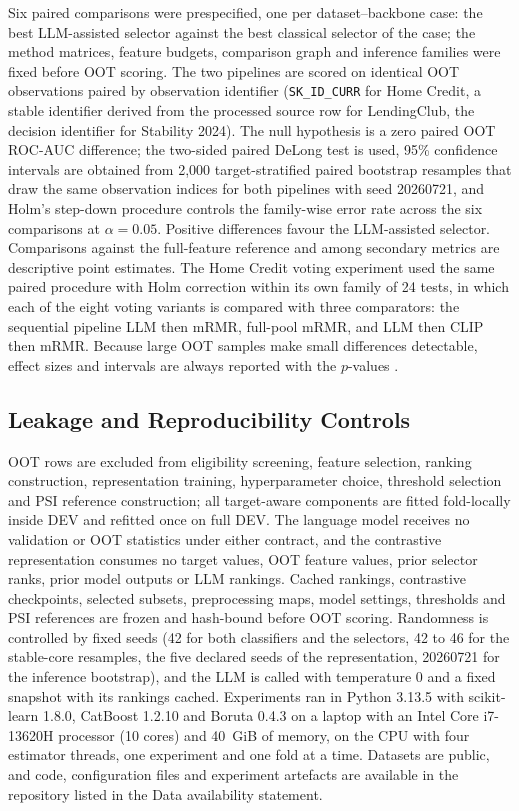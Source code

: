 \documentclass[final,5p,twocolumn]{elsarticle}
\begin{document}
Six paired comparisons were prespecified, one per dataset--backbone case: the best LLM-assisted selector against the best classical selector of the case; the method matrices, feature budgets, comparison graph and inference families were fixed before OOT scoring. The two pipelines are scored on identical OOT observations paired by observation identifier (\texttt{SK\_ID\_CURR} for Home Credit, a stable identifier derived from the processed source row for LendingClub, the decision identifier for Stability 2024). The null hypothesis is a zero paired OOT ROC-AUC difference; the two-sided paired DeLong test \cite{delong1988} is used, 95\% confidence intervals are obtained from 2,000 target-stratified paired bootstrap resamples that draw the same observation indices for both pipelines \cite{efron1993} with seed 20260721, and Holm's step-down procedure \cite{holm1979} controls the family-wise error rate across the six comparisons at $\alpha=0.05$. Positive differences favour the LLM-assisted selector. Comparisons against the full-feature reference and among secondary metrics are descriptive point estimates. The Home Credit voting experiment used the same paired procedure with Holm correction within its own family of 24 tests, in which each of the eight voting variants is compared with three comparators: the sequential pipeline LLM then mRMR, full-pool mRMR, and LLM then CLIP then mRMR. Because large OOT samples make small differences detectable, effect sizes and intervals are always reported with the $p$-values \cite{demsar2006}.

\subsection{Leakage and Reproducibility Controls}
\label{subsec:leakage_controls}

OOT rows are excluded from eligibility screening, feature selection, ranking construction, representation training, hyperparameter choice, threshold selection and PSI reference construction; all target-aware components are fitted fold-locally inside DEV and refitted once on full DEV. The language model receives no validation or OOT statistics under either contract, and the contrastive representation consumes no target values, OOT feature values, prior selector ranks, prior model outputs or LLM rankings. Cached rankings, contrastive checkpoints, selected subsets, preprocessing maps, model settings, thresholds and PSI references are frozen and hash-bound before OOT scoring. Randomness is controlled by fixed seeds (42 for both classifiers and the selectors, 42 to 46 for the stable-core resamples, the five declared seeds of the representation, 20260721 for the inference bootstrap), and the LLM is called with temperature 0 and a fixed snapshot with its rankings cached. Experiments ran in Python 3.13.5 with scikit-learn 1.8.0, CatBoost 1.2.10 and Boruta 0.4.3 on a laptop with an Intel Core i7-13620H processor (10 cores) and 40~GiB of memory, on the CPU with four estimator threads, one experiment and one fold at a time. Datasets are public, and code, configuration files and experiment artefacts are available in the repository listed in the Data availability statement.
\end{document}
